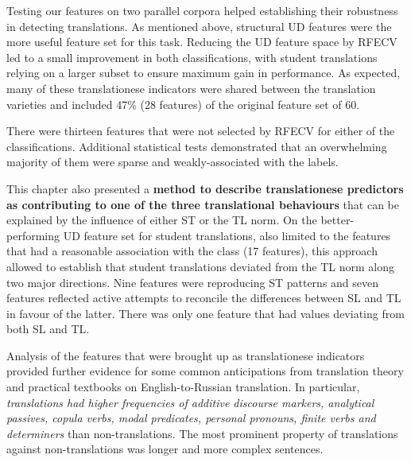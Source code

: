 Testing our features on two parallel corpora helped establishing their robustness in detecting translations. 
As mentioned above, structural UD features were the more useful feature set for this task.
Reducing the UD feature space by RFECV led to a small improvement in both classifications, with student translations relying on a larger subset to ensure maximum gain in performance. As expected, many of these translationese indicators were shared between the translation varieties and included 47\% (28 features) of the original feature set of 60.

There were thirteen features that were not selected by RFECV for either of the classifications. Additional statistical tests demonstrated that an overwhelming majority of them were sparse and weakly-associated with the labels. 

This chapter also presented a \textbf{method to describe translationese predictors as contributing to one of the three translational behaviours} that can be explained by the influence of either ST or the TL norm. On the better-performing UD feature set for student translations, also limited to the features that had a reasonable association with the class (17 features), this approach allowed to establish that student translations deviated from the TL norm along two major directions. Nine features were reproducing ST patterns and seven features reflected active attempts to reconcile the differences between SL and TL in favour of the latter. 
There was only one feature that had values deviating from both SL and TL. 

Analysis of the features that were brought up as translationese indicators provided further evidence for some common anticipations from translation theory and practical textbooks on English-to-Russian translation. In particular, \textit{translations had higher frequencies of additive discourse markers, analytical passives, copula verbs, modal predicates, personal pronouns, finite verbs and determiners} than non-translations. The most prominent property of translations against non-translations was longer and more complex sentences. 


